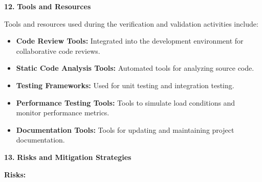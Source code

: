 \documentclass[
]{article}
\begin{document}
\protect\hypertarget{Accc}{}{}\textbf{12.} \textbf{ Tools and Resources}


Tools and resources used during the verification and validation
activities include:

\begin{itemize}
\item
  \textbf{Code Review Tools:} Integrated into the development
  environment for collaborative code reviews.
\item
  \textbf{Static Code Analysis Tools:} Automated tools for analyzing
  source code.
\item
  \textbf{Testing Frameworks:} Used for unit testing and integration
  testing.
\item
  \textbf{Performance Testing Tools:} Tools to simulate load conditions
  and monitor performance metrics.
\item
  \textbf{Documentation Tools:} Tools for updating and maintaining
  project documentation.
\end{itemize}


\protect\hypertarget{Aggg}{}{}\textbf{13.} \textbf{ Risks and Mitigation Strategies}


\textbf{Risks:}
\end{document}
